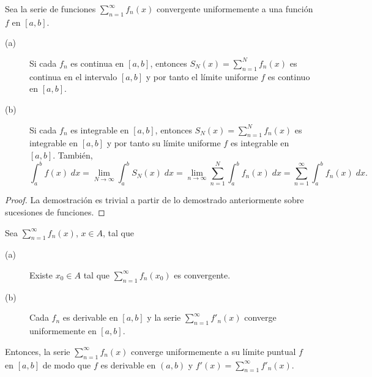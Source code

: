 \begin{ftheorem}[]
	\normalfont Sea la serie de funciones $\displaystyle \sum^{\infty}_{n = 1}f_{n}\left(x\right) $ convergente uniformemente a una función $\displaystyle f $ en $\displaystyle \left[a,b\right]  $.
	\begin{description}
		\item[(a)] Si cada $\displaystyle f_{n} $ es continua en $\displaystyle \left[a,b\right]  $, entonces $\displaystyle S_{N}\left(x\right) = \sum^{N}_{n = 1}f_{n}\left(x\right) $ es continua en el intervalo $\displaystyle \left[a,b\right]  $ y por tanto el límite uniforme $\displaystyle f $ es continuo en $\displaystyle \left[a,b\right]  $.
		\item[(b)] Si cada $\displaystyle f_{n} $ es integrable en $\displaystyle \left[a,b\right]  $, entonces $\displaystyle S_{N}\left(x\right) = \sum^{N}_{n = 1}f_{n}\left(x\right) $ es integrable en $\displaystyle \left[a,b\right]  $ y por tanto su límite uniforme $\displaystyle f $ es integrable en $\displaystyle \left[a,b\right]  $. También,
			\[\int^{b}_{a} f\left(x\right) \; dx = \lim_{N \to \infty}\int^{b}_{a} S_{N}\left(x\right) \; dx = \lim_{n \to \infty}\sum^{N}_{n = 1}\int^{b}_{a} f_{n}\left(x\right) \; dx = \sum^{\infty}_{n = 1}\int^{b}_{a} f_{n}\left(x\right) \; dx.\]
	\end{description}
\end{ftheorem}
\begin{proof}
La demostración es trivial a partir de lo demostrado anteriormente sobre sucesiones de funciones.
\end{proof}
\begin{ftheorem}[]
\normalfont Sea $\displaystyle \sum^{\infty}_{n = 1}f_{n}\left(x\right) $, $\displaystyle x \in A $, tal que 
\begin{description}
\item[(a)] Existe $\displaystyle x_{0} \in A $ tal que $\displaystyle \sum^{\infty}_{n = 1}f_{n}\left(x_{0}\right) $ es convergente.
\item[(b)] Cada $\displaystyle f_{n} $ es derivable en $\displaystyle \left[a,b\right]  $ y la serie $\displaystyle \sum^{\infty}_{n = 1}f'_{n}\left(x\right) $ converge uniformemente en $\displaystyle \left[a,b\right]  $.
\end{description}
Entonces, la serie $\displaystyle \sum^{\infty}_{n = 1}f_{n}\left(x\right) $ converge uniformemente a su límite puntual $\displaystyle f $ en $\displaystyle \left[a,b\right]  $ de modo que $\displaystyle f $ es derivable en $\displaystyle \left(a,b\right) $ y $\displaystyle f'\left(x\right) = \sum^{\infty}_{n = 1}f'_{n}\left(x\right) $.
\end{ftheorem}

